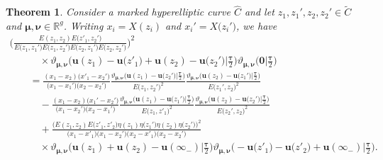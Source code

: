 \documentclass[10pt,a4paper]{amsart}
\numberwithin{equation}{section}
\newtheorem{Theorem}{Theorem}[section]
\begin{document}
\begin{Theorem}\label{thm:formula_beta_1}
 Consider a marked hyperelliptic curve $\widehat{C}$ and let
 $z_1,z_1',z_2,z_2' \in \widetilde{C}$ and $\bm{\mu}, \bm{\nu} \in \mathbb{R}^g$. Writing
 $x_i = X(z_i)$ and $x_i' = X\big(z_i'\big)$, we have
 \begin{gather}
  \biggl(\frac{E(z_1, z_2)E\bigl(z'_1, z_2'\bigr)}{E\bigl(z_1, z_1'\bigr)E\bigl(z_1, z_2'\bigr)E\bigl(z_2, z_1'\bigr)E\bigl(z_2, z_2'\bigr)}\biggr)^{2}\nonumber\\
  \qquad \quad{}\times\vartheta_{\bm{\mu}, \bm{\nu}}\bigl( \bm{u}(z_1) - \bm{u}\bigl(z'_1\bigr) + \bm{u}(z_2) - \bm{u}\bigl(z_2'\bigr)\big|\tfrac{\bm{\tau}}{2}\bigr)\vartheta_{\bm{\mu},\bm{\nu}}\bigl(\bm{0}\big|\tfrac{\bm{\tau}}{2}\bigr)\nonumber \\
 \qquad {}= \frac{(x_1 - x_2)\bigl(x'_1 - x_2'\bigr)}{\bigl(x_1 - x_1'\bigr)\bigl(x_2 - x_2'\bigr)}\frac{\vartheta_{\bm{\mu},\bm{\nu}}\bigl( \bm{u}(z_1) - \bm{u}\bigl(z_2'\bigr)\big|\tfrac{\bm{\tau}}{2}\bigr)}{E\bigl(z_1,z_2'\bigr)^{2}}\frac{\vartheta_{\bm{\mu},\bm{\nu}}\bigl(\bm{u}(z_2) - \bm{u}\bigl(z_1'\bigr)\big|\tfrac{\bm{\tau}}{2}\bigr)}{E\bigl(z_1',z_2\bigr)^{2}}\nonumber\\
 \qquad\quad{}-\frac{(x_1 - x_2)\bigl(x_1' - x_2'\bigr)}{\bigl(x_1 - x_2'\bigr)\bigl(x_2 - x_1'\bigr)}\frac{\vartheta_{\bm{\mu},\bm{\nu}}\bigl(\bm{u}(z_1) - \bm{u}\bigl(z_1'\bigr)\big|\tfrac{\bm{\tau}}{2}\bigr)}{E\bigl(z_1, z'_1\bigr)^{2}}\frac{\vartheta_{\bm{\mu},\bm{\nu}}(\bm{u}(z_2) - \bm{u}\bigl(z_2'\bigr)\big|\tfrac{\bm{\tau}}{2}\bigr)}{E\bigl(z_2', z_2\bigr)^{2}}\nonumber\\
 \qquad\quad{}+\frac{\bigl(E(z_1,z_2)E\bigl(z'_1, z'_2\bigr) \eta(z_1)\eta\bigl(z_1'\bigr)\eta(z_2)\eta\bigl(z_2'\bigr)\bigr)^2}{\bigl(x_1 - x'_1\bigr)\bigl(x_1 -x_2'\bigr)\bigl(x_2 - x'_1\bigr)\bigl(x_2 - x_2'\bigr)} \nonumber\\
 \qquad \quad{} \times \vartheta_{\bm{\mu},\bm{\nu}}\bigl( \bm{u}(z_1) + \bm{u}(z_2) - \bm{u}(\infty_-)\big|\tfrac{\bm{\tau}}{2}\bigr) \vartheta_{\bm{\mu},\bm{\nu}}\bigl(-\bm{u}\bigl(z'_1\bigr) - \bm{u}\bigl(z'_2\bigr) + \bm{u}(\infty_-)\big|\tfrac{\bm{\tau}}{2}\bigr).\label{eq:formula-beta-1}
 \end{gather}
\end{Theorem}
\end{document}
